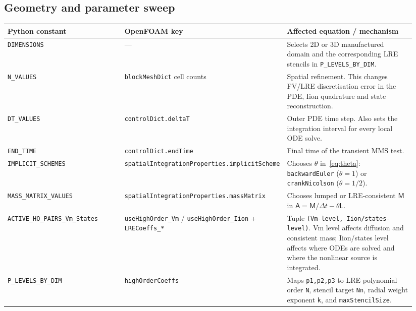 \documentclass[11pt,a4paper]{article}
\newcommand{\Aimp}{\mathsf{A}}
\newcommand{\Mmass}{\mathsf{M}}
\newcommand{\Lop}{\mathsf{L}}
\newcommand{\code}[1]{\texttt{\small #1}}
\begin{document}
\subsection{Geometry and parameter sweep}
\begin{longtable}{@{}p{0.30\linewidth}p{0.28\linewidth}p{0.36\linewidth}@{}}
\toprule
Python constant & OpenFOAM key & Affected equation / mechanism \\
\midrule \endhead
\code{DIMENSIONS} & --- &
   Selects 2D or 3D manufactured domain and the corresponding LRE
   stencils in \code{P\_LEVELS\_BY\_DIM}. \\
\code{N\_VALUES} & \code{blockMeshDict} cell counts &
   Spatial refinement. This changes FV/LRE discretisation error in the
   PDE, Iion quadrature and state reconstruction. \\
\code{DT\_VALUES} & \code{controlDict.deltaT} &
   Outer PDE time step. Also sets the integration interval for every
   local ODE solve. \\
\code{END\_TIME} & \code{controlDict.endTime} &
   Final time of the transient MMS test. \\
\code{IMPLICIT\_SCHEMES} &
   \code{spatialIntegrationProperties.implicitScheme} &
   Chooses $\theta$ in~\eqref{eq:theta}: \code{backwardEuler}
   ($\theta=1$) or \code{crankNicolson} ($\theta=1/2$). \\
\code{MASS\_MATRIX\_VALUES} &
   \code{spatialIntegrationProperties.massMatrix} &
   Chooses lumped or LRE-consistent $\Mmass$ in
   $\Aimp=\Mmass/\Delta t-\theta\Lop$. \\
\code{ACTIVE\_HO\_PAIRS\_Vm\_States} &
   \code{useHighOrder\_Vm} / \code{useHighOrder\_Iion}
   + \code{LRECoeffs\_*} &
   Tuple \code{(Vm-level, Iion/states-level)}. Vm level affects
   diffusion and consistent mass; Iion/states level affects where ODEs
   are solved and where the nonlinear source is integrated. \\
\code{P\_LEVELS\_BY\_DIM} & \code{highOrderCoeffs} &
   Maps \code{p1,p2,p3} to LRE polynomial order \code{N}, stencil
   target \code{Nn}, radial weight exponent \code{k}, and
   \code{maxStencilSize}. \\
\bottomrule
\end{longtable}
\end{document}
